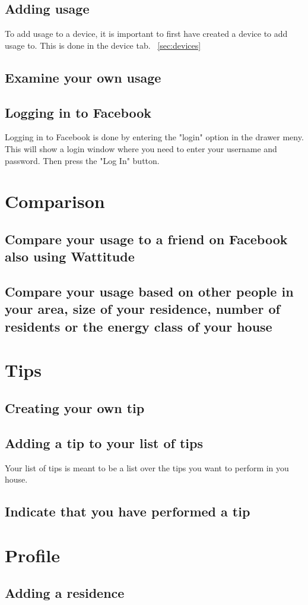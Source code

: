 \subsection{Adding usage}
To add usage to a device, it is important to first have created a device to add usage to. This is done in the device tab. ~\ref{sec:devices}
\subsection{Examine your own usage}


\subsection{Logging in to Facebook}
Logging in to Facebook is done by entering the "login" option in the drawer meny. This will show a login window where you need to enter your username and password. Then press the "Log In" button. 

\section{Comparison}
\subsection{Compare your usage to a friend on Facebook also using Wattitude}
\subsection{Compare your usage based on other people in your area, size of your residence, number of residents or the energy class of your house}

\section{Tips}
\subsection{Creating your own tip}
\subsection{Adding a tip to your list of tips}
Your list of tips is meant to be a list over the tips you want to perform in you house. 
\subsection{Indicate that you have performed a tip}


\section{Profile}
\subsection{Adding a residence}
